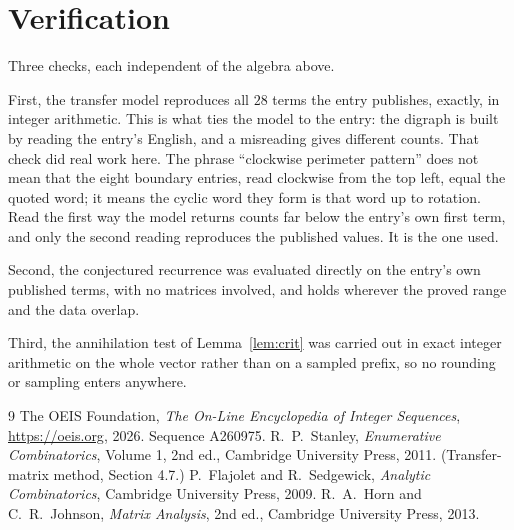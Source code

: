 \documentclass[11pt,a4paper]{article}
\theoremstyle{plain}
\theoremstyle{definition}
\begin{document}
\section{Verification}

Three checks, each independent of the algebra above.

First, the transfer model reproduces all $28$ terms the entry publishes, exactly, in
integer arithmetic. This is what ties the model to the entry: the digraph is built by reading
the entry's English, and a misreading gives different counts. That check did real work here. The phrase ``clockwise perimeter pattern'' does not mean that the eight boundary entries, read clockwise from the top left, equal the quoted word; it means the cyclic word they form is that word up to rotation. Read the first way the model returns counts far below the entry's own first term, and only the second reading reproduces the published values. It is the one used.

Second, the conjectured recurrence was evaluated directly on the entry's own published terms,
with no matrices involved, and holds wherever the proved range and the data overlap.

Third, the annihilation test of Lemma~\ref{lem:crit} was carried out in exact integer
arithmetic on the whole vector rather than on a sampled prefix, so no rounding or sampling
enters anywhere.

\begin{thebibliography}{9}
 The OEIS Foundation, \emph{The On-Line Encyclopedia of Integer
Sequences}, \url{https://oeis.org}, 2026. Sequence A260975.
 R.~P.~Stanley, \emph{Enumerative Combinatorics}, Volume 1, 2nd ed.,
Cambridge University Press, 2011. (Transfer-matrix method, Section 4.7.)
 P.~Flajolet and R.~Sedgewick, \emph{Analytic Combinatorics}, Cambridge
University Press, 2009.
 R.~A.~Horn and C.~R.~Johnson, \emph{Matrix Analysis}, 2nd ed., Cambridge
University Press, 2013.
\end{thebibliography}
\end{document}
